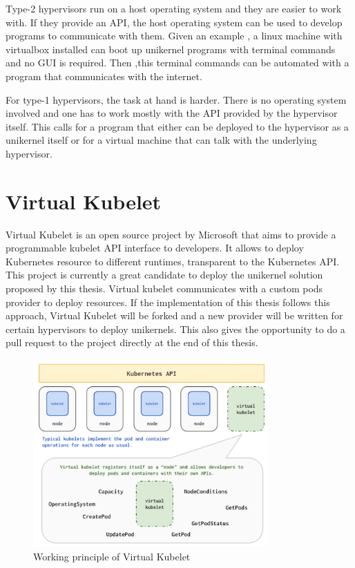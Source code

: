 Type-2 hypervisors run on a host operating system and they are easier to work with. If they provide an API, the host operating system can be used to develop programs to communicate with them. Given an example , a linux machine with virtualbox installed can boot up unikernel programs with terminal commands and no GUI is required. Then ,this terminal commands can be automated with a program that communicates with the internet.

For type-1 hypervisors, the task at hand is harder. There is no operating system involved and one has to work mostly with the API provided by the hypervisor itself. This calls for a program that either can be deployed to the hypervisor as a unikernel itself or for a virtual machine that can talk with the underlying hypervisor.
\fi



\section{Virtual Kubelet}
Virtual Kubelet\cite{virtual} is an open source project by Microsoft that aims to provide a programmable kubelet API interface to developers. It allows to deploy Kubernetes resource to different runtimes, transparent to the Kubernetes API. This project is currently a great candidate to deploy the unikernel solution proposed by this thesis. Virtual kubelet communicates with a custom pods provider to deploy resources. If the implementation of this thesis follows this approach, Virtual Kubelet will be forked and a new provider will be written for certain hypervisors to deploy unikernels. This also gives the opportunity to do a pull request to the project directly at the end of this thesis.

\begin{figure}[htpb]
  \centering
  \includegraphics[width=0.8\textwidth]{figures/vk.png}
  \caption{Working principle of Virtual Kubelet \cite{virtual}} \label{fig:vk}
\end{figure}

